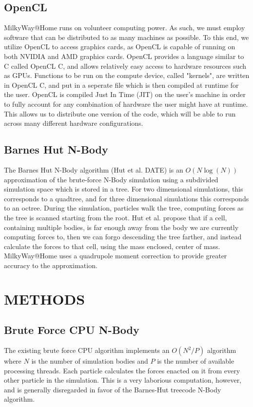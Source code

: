 \documentclass{thesis}
\begin{document}
\section{OpenCL}
MilkyWay@Home runs on volunteer computing power. As such, we must employ software that can be distributed to as many machines as possible. To this end, we utilize OpenCL to access graphics cards, as OpenCL is capable of running on both NVIDIA and AMD graphics cards. OpenCL provides a language similar to C called OpenCL C, and allows relatively easy access to hardware resources such as GPUs. Functions to be run on the compute device, called "kernels", are written in OpenCL C, and put in a seperate file which is then compiled at runtime for the user. OpenCL is compiled Just In Time (JIT) on the user's machine in order to fully account for any combination of hardware the user might have at runtime. This allows us to distribute one version of the code, which will be able to run across many different hardware configurations.
\section{Barnes Hut N-Body}
The Barnes Hut N-Body algorithm (Hut et al. DATE) is an $O(N\log(N))$ approximation of the brute-force N-Body simulation using a subdivided simulation space which is stored in a tree. For two dimensional simulations, this corresponds to a quadtree, and for three dimensional simulations this corresponds to an octree. During the simulation, particles walk the tree, computing forces as the tree is scanned starting from the root. Hut et al. propose that if a cell, containing multiple bodies, is far enough away from the body we are currently computing forces to, then we can forgo descending the tree farther, and instead calculate the forces to that cell, using the mass enclosed, center of mass. MilkyWay@Home uses a quadrupole moment correction to provide greater accuracy to the approximation.
\chapter{METHODS}
\section{Brute Force CPU N-Body}
The existing brute force CPU algorithm implements an $O(N^2/P)$ algorithm where $N$ is the number of simulation bodies and $P$ is the number of available processing threads. Each particle calculates the forces enacted on it from every other particle in the simulation. This is a very laborious computation, however, and is generally disregarded in favor of the Barnes-Hut treecode N-Body algorithm.
\end{document}
